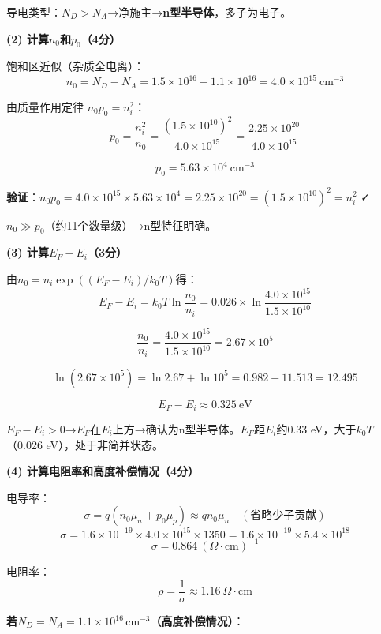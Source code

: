 \documentclass[12pt,a4paper]{ctexart}
\begin{document}
导电类型：$N_D > N_A$→净施主→\textbf{n型半导体}，多子为电子。

\vspace{6pt}

\noindent\textbf{(2) 计算$n_0$和$p_0$（4分）}

饱和区近似（杂质全电离）：
\[
n_0 = N_D - N_A = 1.5 \times 10^{16} - 1.1 \times 10^{16}
= \boxed{4.0 \times 10^{15}\ \text{cm}^{-3}}
\]

由质量作用定律 $n_0 p_0 = n_i^2$：
\[
p_0 = \frac{n_i^2}{n_0} = \frac{(1.5 \times 10^{10})^2}{4.0 \times 10^{15}}
= \frac{2.25 \times 10^{20}}{4.0 \times 10^{15}}
\]

\[
\boxed{p_0 = 5.63 \times 10^4\ \text{cm}^{-3}}
\]

\textbf{验证}：$n_0 p_0 = 4.0\times10^{15} \times 5.63\times10^{4} = 2.25\times10^{20} = (1.5\times10^{10})^2 = n_i^2$ ✓

$n_0 \gg p_0$（约11个数量级）→n型特征明确。

\vspace{6pt}

\noindent\textbf{(3) 计算$E_F - E_i$（3分）}

由$n_0 = n_i \exp((E_F - E_i)/k_0T)$得：
\[
E_F - E_i = k_0T \ln\frac{n_0}{n_i}
= 0.026 \times \ln\frac{4.0 \times 10^{15}}{1.5 \times 10^{10}}
\]

\[
\frac{n_0}{n_i} = \frac{4.0 \times 10^{15}}{1.5 \times 10^{10}} = 2.67 \times 10^5
\]

\[
\ln(2.67 \times 10^5) = \ln 2.67 + \ln 10^5 = 0.982 + 11.513 = 12.495
\]

\[
\boxed{E_F - E_i \approx 0.325\ \text{eV}}
\]

$E_F - E_i > 0$→$E_F$在$E_i$上方→确认为n型半导体。$E_F$距$E_i$约0.33 eV，大于$k_0T$（0.026 eV），处于非简并状态。

\vspace{6pt}

\noindent\textbf{(4) 计算电阻率和高度补偿情况（4分）}

电导率：
\[
\sigma = q(n_0\mu_n + p_0\mu_p) \approx q n_0 \mu_n \quad (\text{省略少子贡献})
\]
\[
\sigma = 1.6 \times 10^{-19} \times 4.0 \times 10^{15} \times 1350
= 1.6 \times 10^{-19} \times 5.4 \times 10^{18}
\]
\[
\sigma = 0.864\ (\Omega\cdot\text{cm})^{-1}
\]

电阻率：
\[
\boxed{\rho = \frac{1}{\sigma} \approx 1.16\ \Omega\cdot\text{cm}}
\]

\textbf{若$N_D = N_A = 1.1\times10^{16}\,\text{cm}^{-3}$（高度补偿情况）}：
\end{document}
